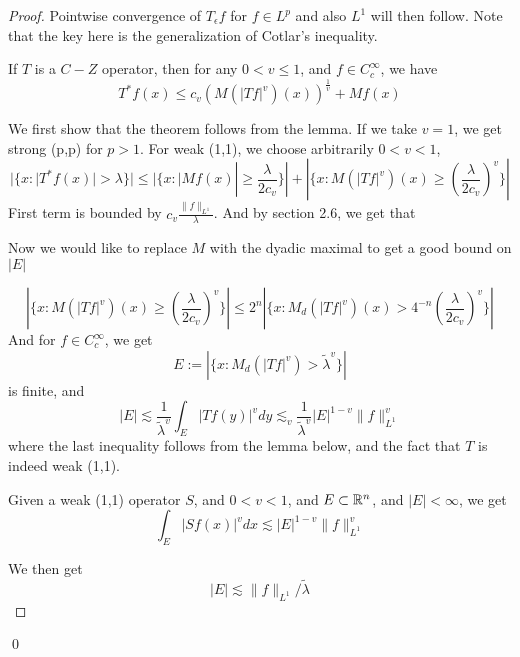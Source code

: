 \begin{proof}
    Pointwise convergence of $T_\epsilon f$ for $f\in L^p$ and also $L^1$ will then follow. Note that the key here is the generalization of Cotlar's inequality.

    \begin{lemma}[5.15 Cotlar]
        If $T$ is a $C-Z$ operator, then for any $0<v\leq 1$, and $f\in C_c^\infty$, we have 
        \begin{equation*}
            T^*f(x)\leq c_v (M(|Tf|^v)(x))^\frac{1}{v}+Mf(x)
        \end{equation*}
    \end{lemma}
    We first show that the theorem follows from the lemma. If we take $v=1$, we get strong (p,p) for $p>1$. For weak (1,1), we choose arbitrarily $0<v<1$, 
    \begin{equation*}
        |\{x: |T^*f(x)|>\lambda\}|\leq |\{x: |Mf(x)|\geq \frac{\lambda}{2c_v}\}|+|\{x: M(|Tf|^v)(x)\geq(\frac{\lambda}{2c_v})^v\}|
    \end{equation*}
    First term is bounded by $c_v \frac{\|f\|_{L^1}}{\lambda}$. And by section 2.6, we get that
    \begin{note}
        Now we would like to replace $M$ with the dyadic maximal to get a good bound on $|E|$
    \end{note}
    \begin{equation*}
        |\{x: M(|Tf|^v)(x)\geq(\frac{\lambda}{2c_v})^v\}|\leq 2^n|\{x: M_d(|Tf|^v)(x)>4^{-n}\left(\frac{\lambda}{2c_v}\right)^v\}|
    \end{equation*}
    And for $f\in C_c^\infty$, we get 
    \begin{equation*}
        E:=|\{x: M_d(|Tf|^v)>\tilde{\lambda}^v\}|
    \end{equation*}
    is finite, and 
    \begin{equation*}
        |E|\lesssim \frac{1}{\tilde{\lambda}^v}\int_E |Tf(y)|^v dy\lesssim_v\frac{1}{\tilde{\lambda}^v}|E|^{1-v}\|f\|_{L^1}^v
    \end{equation*}
    where the last inequality follows from the lemma below, and the fact that $T$ is indeed weak (1,1).
    \begin{lemma}[Kolmogorov]
        Given a weak (1,1) operator $S$, and $0<v<1$, and $E\subset\mathbb{R}^n$, and $|E|<\infty$, we get 
        \begin{equation*}
            \int_E |Sf(x)|^vdx\lesssim |E|^{1-v}\|f\|_{L^1}^v
        \end{equation*}
    \end{lemma}
    We then get 
    \begin{equation*}
        |E|\lesssim \|f\|_{L^1}/\tilde{\lambda}
    \end{equation*}
\end{proof}
\qed

